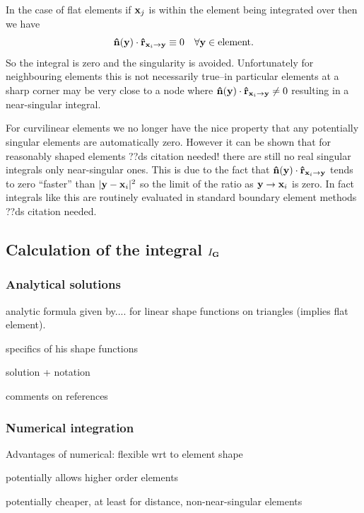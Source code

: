 In the case of flat elements if $\mathbf{x}_{j}$ is within the element being integrated over then we have 
\begin{equation}
  \label{eq:7}
  \mathbf{\hat{n}}(\mathbf{y}) \cdot \mathbf{\hat{r}}_{\mathbf{x}_{{i}} \rightarrow \mathbf{y}} \equiv 0 \quad \forall \mathbf{y} \in \text{element}.
\end{equation}
So the integral is zero and the singularity is avoided. Unfortunately for neighbouring elements this is not necessarily true--in particular elements at a sharp corner may be very close to a node where $\mathbf{\hat{n}}(\mathbf{y}) \cdot \mathbf{\hat{r}}_{\mathbf{x}_{{i}} \rightarrow \mathbf{y}} \neq 0$ resulting in a near-singular integral.

For curvilinear elements we no longer have the nice property that any potentially singular elements are automatically zero. However it can be shown that for reasonably shaped elements ??ds citation needed! there are still no real singular integrals only near-singular ones. This is due to the fact that $\mathbf{\hat{n}}(\mathbf{y}) \cdot \mathbf{\hat{r}}_{\mathbf{x}_{{i}} \rightarrow \mathbf{y}}$ tends to zero ``faster'' than $|\mathbf{y} - \mathbf{x}_{i}|^2$ so the limit of the ratio as $\mathbf{y} \rightarrow \mathbf{x}_{i}$ is zero. In fact integrals like this are routinely evaluated in standard boundary element methods ??ds citation needed.






\subsection{Calculation of the integral $I_{\mathbf{G}}$}

\subsubsection{Analytical solutions}

analytic formula given by.... for linear shape functions on triangles (implies flat element).

specifics of his shape functions

solution + notation

comments on references


\subsubsection{Numerical integration}

Advantages of numerical: flexible wrt to element shape

potentially allows higher order elements

potentially cheaper, at least for distance, non-near-singular elements



